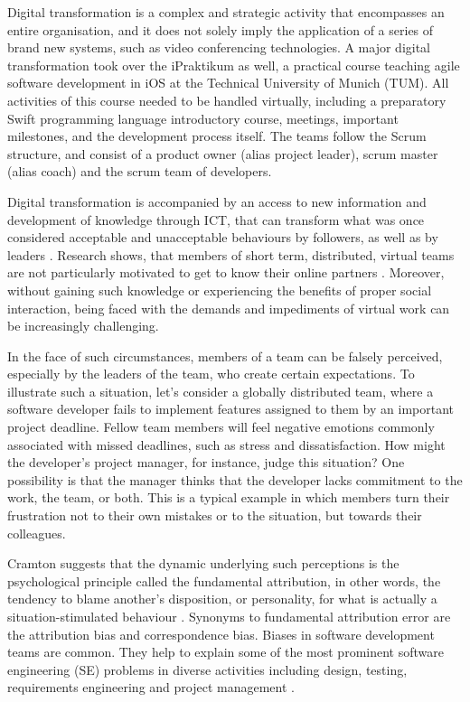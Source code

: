 Digital transformation is a complex and strategic activity that encompasses an entire organisation, and it does not solely imply the application of a series of brand new systems, such as video conferencing technologies. A major digital transformation took over the iPraktikum as well, a practical course teaching agile software development in iOS at the Technical University of Munich (TUM). All activities of this course needed to be handled virtually, including a preparatory Swift programming language introductory course, meetings, important milestones, and the development process itself. The teams follow the Scrum structure, and consist of a product owner (alias project leader), scrum master (alias coach) and the scrum team of developers.

Digital transformation is accompanied by an access to new information and development of knowledge through ICT, that can transform what was once considered acceptable and unacceptable behaviours by followers, as well as by leaders \cite{Avolio2000}. Research shows, that members of short term, distributed, virtual teams are not particularly motivated to get to know their online partners \cite{Walther2002}. Moreover, without gaining such knowledge or experiencing the benefits of proper social interaction, being faced with the demands and impediments of virtual work can be increasingly challenging.  

In the face of such circumstances, members of a team can be falsely perceived, especially by the leaders of the team, who create certain expectations. To illustrate such a situation, let's consider a globally distributed team,  where a software developer fails to implement features assigned to them by an important project deadline. Fellow team members will feel negative emotions commonly associated with missed deadlines, such as stress and dissatisfaction.  How might the developer’s project manager, for instance, judge this situation? One possibility is that the manager thinks that the developer lacks commitment to the work, the team, or both.  This is a typical example in which members turn their frustration not to their own mistakes or to the situation, but towards their colleagues.  

Cramton \cite{Cramton2001} suggests that the dynamic underlying such perceptions is the psychological principle called the fundamental attribution, in other words, the tendency to blame another's disposition, or personality, for what is actually a situation-stimulated behaviour \cite{Tidwell2002}.  Synonyms to fundamental attribution error are the attribution bias and correspondence bias.  Biases in software development teams are common.  They help to explain some of the most prominent software engineering (SE) problems in diverse activities including design, testing, requirements engineering  and project management \cite{Mohanai2018}.  

